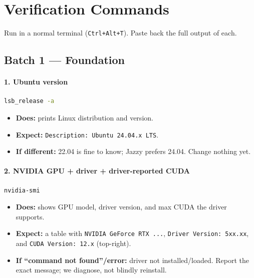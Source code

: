 \documentclass[11pt]{article}
\begin{document}
\section{Verification Commands}

Run in a normal terminal (\texttt{Ctrl+Alt+T}). Paste back the full output of each.

\subsection{Batch 1 --- Foundation}

\paragraph{1. Ubuntu version}
\begin{lstlisting}[language=bash]
lsb_release -a
\end{lstlisting}
\begin{itemize}[leftmargin=*]
  \item \textbf{Does:} prints Linux distribution and version.
  \item \textbf{Expect:} \texttt{Description: Ubuntu 24.04.x LTS}.
  \item \textbf{If different:} 22.04 is fine to know; Jazzy prefers 24.04. Change
  nothing yet.
\end{itemize}

\paragraph{2. NVIDIA GPU + driver + driver-reported CUDA}
\begin{lstlisting}[language=bash]
nvidia-smi
\end{lstlisting}
\begin{itemize}[leftmargin=*]
  \item \textbf{Does:} shows GPU model, driver version, and max CUDA the driver
  supports.
  \item \textbf{Expect:} a table with \texttt{NVIDIA GeForce RTX ...},
  \texttt{Driver Version: 5xx.xx}, and \texttt{CUDA Version: 12.x} (top-right).
  \item \textbf{If ``command not found''/error:} driver not installed/loaded.
  Report the exact message; we diagnose, not blindly reinstall.
\end{itemize}
\end{document}

